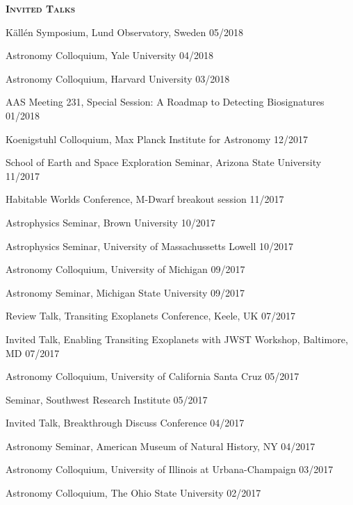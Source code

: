 \documentclass[12pt,letterpaper]{article}
\begin{document}
\vspace{3mm}



\vspace{5mm}
\textbf{\textsc{Invited Talks}} 
\begin{compactitem}[]
\item {K\"{a}ll\'{e}n Symposium, Lund Observatory, Sweden \hfill 05/2018}
\item {Astronomy Colloquium, Yale University \hfill 04/2018}
\item{Astronomy Colloquium, Harvard University \hfill 03/2018}
\item {AAS Meeting 231, Special Session: A Roadmap to Detecting Biosignatures \hfill 01/2018}
\item {Koenigstuhl Colloquium, Max Planck Institute for Astronomy \hfill 12/2017}
\item {School of Earth and Space Exploration Seminar, Arizona State University \hfill 11/2017}
\item {Habitable Worlds Conference, M-Dwarf breakout session \hfill 11/2017}
\item {Astrophysics Seminar, Brown University \hfill 10/2017}
\item {Astrophysics Seminar, University of Massachussetts Lowell \hfill 10/2017}
\item {Astronomy Colloquium, University of Michigan \hfill 09/2017}
\item {Astronomy Seminar, Michigan State University \hfill 09/2017}
\item {Review Talk, Transiting Exoplanets Conference, Keele, UK \hfill 07/2017}
\item {Invited Talk, Enabling Transiting Exoplanets with JWST Workshop, Baltimore, MD \hfill 07/2017}
\item {Astronomy Colloquium, University of California Santa Cruz \hfill 05/2017}
\item {Seminar, Southwest Research Institute \hfill 05/2017}
\item {Invited Talk, Breakthrough Discuss Conference \hfill 04/2017}
\item {Astronomy Seminar, American Museum of Natural History, NY \hfill 04/2017}
\item {Astronomy Colloquium, University of Illinois at Urbana-Champaign \hfill 03/2017}
\item {Astronomy Colloquium, The Ohio State University \hfill 02/2017}

\end{compactitem}
\end{document}
